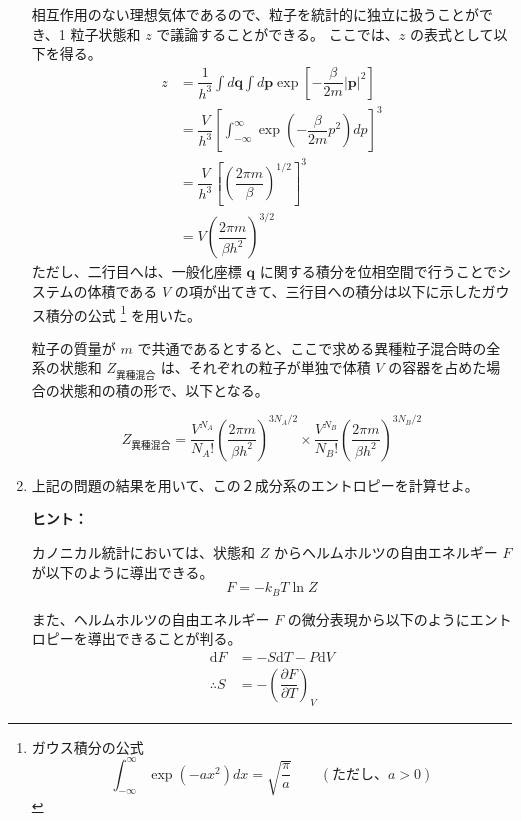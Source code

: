 \documentclass[uplatex,dvipdfmx,a4paper,11pt]{jsarticle}
\newcommand{\diff}{\mathrm d}
\begin{document}
\begin{enumerate}
相互作用のない理想気体であるので、粒子を統計的に独立に扱うことができ、1 粒子状態和 $z$ で議論することができる。
ここでは、$z$ の表式として以下を得る。
\begin{align*}
	z 	&= \dfrac{1}{h^{3}} \int d\bm{q} \int d\bm{p} \exp \left[ -\dfrac{\beta}{2m} |\bm{p}|^2 \right] \\
		&= \dfrac{V}{h^{3}} \left[ \int_{-\infty}^{\infty} \exp \left( -\dfrac{\beta}{2m} p^2 \right) dp \right]^{3} \\
        	&= \dfrac{V}{h^{3}} \left[ \left(\dfrac{2 \pi m}{\beta} \right)^{1/2} \right]^{3} \\
        	&= V \left(\dfrac{2 \pi m}{\beta h^2} \right)^{3/2}
                \label{eq:Z_ideal}
\end{align*}
ただし、二行目へは、一般化座標 $\bm{q}$ に関する積分を位相空間で行うことでシステムの体積である $V$ の項が出てきて、三行目への積分は以下に示したガウス積分の公式
\footnote{
ガウス積分の公式
\begin{equation*}
	\int_{-\infty}^{\infty} \exp(-ax^2)dx = \sqrt{\dfrac{\pi}{a}} \qquad (\text{ただし、$a > 0$}) 
        \label{eq:gauss_sekibunn}
\end{equation*}
}
を用いた。

粒子の質量が $m$ で共通であるとすると、ここで求める異種粒子混合時の全系の状態和 $Z_{\text{異種混合}}$ は、それぞれの粒子が単独で体積 $V$ の容器を占めた場合の状態和の積の形で、以下となる。

\begin{equation*}
Z_{\text{異種混合}} = \dfrac{V^{N_A}}{N_A !}\left(\dfrac{2 \pi m}{\beta h^2} \right)^{3 N_A /2} \times \dfrac{V^{N_B}}{N_B !}\left(\dfrac{2 \pi m}{\beta h^2} \right)^{3 N_B /2}
\end{equation*}

\newpage

\item
上記の問題の結果を用いて、この２成分系のエントロピーを計算せよ。
\vspace{8pt}
\begin{itembox}[l]{{\bf ヒント：}}

カノニカル統計においては、状態和 $Z$ からヘルムホルツの自由エネルギー $F$ が以下のように導出できる。
\begin{equation*}
F = -k_BT \ln Z
\end{equation*}  

また、ヘルムホルツの自由エネルギー $F$ の微分表現から以下のようにエントロピーを導出できることが判る。
\begin{align*}
\diff F &= -S \diff T - P \diff V \\
\therefore S &= -\left(\dfrac{\partial F}{\partial T} \right)_V
\end{align*}


\end{itembox}
\end{enumerate}
\end{document}
